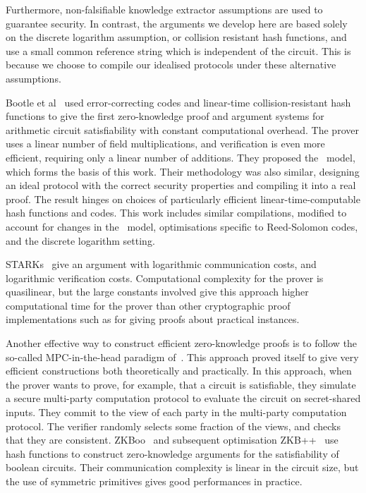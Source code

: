 Furthermore, non-falsifiable knowledge extractor assumptions are used to guarantee security.  In contrast, the arguments we develop here are based solely on the discrete logarithm assumption, or collision resistant hash functions, and use a small common reference string which is independent of the circuit. This is because we choose to compile our idealised protocols under these alternative assumptions.

Bootle et al~\cite{BootleCGGHJ17} used error-correcting codes and linear-time collision-resistant hash functions to give the first zero-knowledge proof and argument systems for arithmetic circuit satisfiability with constant computational overhead.  The prover uses a linear number of field multiplications, and verification is even more efficient, requiring only a linear number of additions. They proposed the \ILC\ model, which forms the basis of this work. Their methodology was also similar, designing an ideal protocol with the correct security properties and compiling it into a real proof. The result hinges on choices of particularly efficient linear-time-computable hash functions and codes. This work includes similar compilations, modified to account for changes in the \ILC\ model, optimisations specific to Reed-Solomon codes, and the discrete logarithm setting.

STARKs~\cite{Ben-SassonBHR18} give an argument with logarithmic communication costs, and logarithmic verification costs. Computational complexity for the prover is quasilinear, but the large constants involved give this approach higher computational time for the prover than other cryptographic proof implementations such as \cite{BunzBBPWM18,WahbyTSTW18} for giving proofs about practical instances.

Another effective way to construct efficient zero-knowledge proofs is to follow the so-called MPC-in-the-head paradigm of~\cite{IshaiKOS07}. This approach proved itself to give very efficient constructions both theoretically and practically. In this approach, when the prover wants to prove, for example, that a circuit is satisfiable, they simulate a secure multi-party computation protocol to evaluate the circuit on secret-shared inputs. They commit to the view of each party in the multi-party computation protocol. The verifier randomly selects some fraction of the views, and checks that they are consistent. ZKBoo~\cite{USENIX:GiaMadOrl16} and subsequent optimisation ZKB++~\cite{CCS:CDGORR17} use hash functions to construct zero-knowledge arguments for the satisfiability of boolean circuits. Their communication complexity is linear in the circuit size, but the use of symmetric primitives gives good performances in practice.

